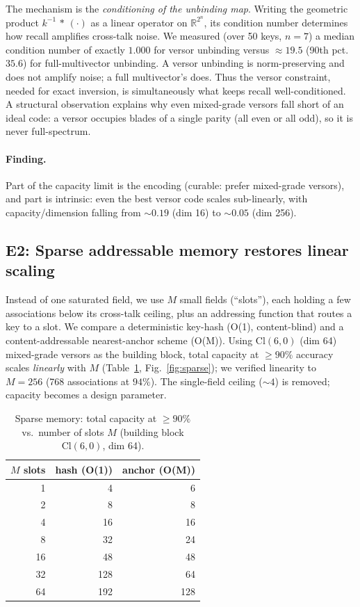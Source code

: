 \documentclass[10pt,twocolumn]{article}
\newcommand{\gp}{\,{*}\,}            %
\newcommand{\real}{\mathbb{R}}
\newcommand{\Cl}{\mathrm{Cl}}
\begin{document}
The mechanism is the \emph{conditioning of the unbinding map}. Writing the
geometric product $k^{-1}\gp(\cdot)$ as a linear operator on $\real^{2^n}$, its
condition number determines how recall amplifies cross-talk noise. We measured
(over 50 keys, $n=7$) a median condition number of exactly $1.000$ for versor
unbinding versus $\approx 19.5$ (90th pct.\ $35.6$) for full-multivector
unbinding. A versor unbinding is norm-preserving and does not amplify noise;
a full multivector's does. Thus the versor constraint, needed for exact
inversion, is simultaneously what keeps recall well-conditioned. A structural
observation explains why even mixed-grade versors fall short of an ideal code:
a versor occupies blades of a single parity (all even or all odd), so it is
never full-spectrum.

\paragraph{Finding.} Part of the capacity limit is the encoding (curable: prefer
mixed-grade versors), and part is intrinsic: even the best versor code scales
sub-linearly, with capacity/dimension falling from $\sim0.19$ (dim 16) to
$\sim0.05$ (dim 256).

\subsection{E2: Sparse addressable memory restores linear scaling}
Instead of one saturated field, we use $M$ small fields (``slots''), each holding
a few associations below its cross-talk ceiling, plus an addressing function that
routes a key to a slot. We compare a deterministic key-hash (O(1), content-blind)
and a content-addressable nearest-anchor scheme (O(M)). Using $\Cl(6,0)$
(dim 64) mixed-grade versors as the building block, total capacity at
$\ge 90\%$ accuracy scales \emph{linearly} with $M$
(Table~\ref{tab:sparse}, Fig.~\ref{fig:sparse}); we verified linearity to
$M=256$ (768 associations at $94\%$). The single-field ceiling ($\sim 4$) is
removed; capacity becomes a design parameter.

\begin{table}[t]
\centering
\caption{Sparse memory: total capacity at $\ge 90\%$ vs.\ number of slots $M$
(building block $\Cl(6,0)$, dim 64).}
\label{tab:sparse}
\small
\begin{tabular}{rrr}
\toprule
$M$ slots & hash (O(1)) & anchor (O(M))\\
\midrule
1  & 4   & 6\\
2  & 8   & 8\\
4  & 16  & 16\\
8  & 32  & 24\\
16 & 48  & 48\\
32 & 128 & 64\\
64 & 192 & 128\\
\bottomrule
\end{tabular}
\end{table}
\end{document}
